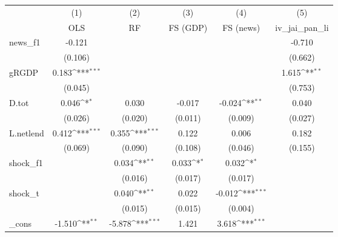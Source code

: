 {
\def\sym#1{\ifmmode^{#1}\else\(^{#1}\)\fi}
\begin{tabular}{l*{5}{c}}
\toprule
            &\multicolumn{1}{c}{(1)}&\multicolumn{1}{c}{(2)}&\multicolumn{1}{c}{(3)}&\multicolumn{1}{c}{(4)}&\multicolumn{1}{c}{(5)}\\
            &\multicolumn{1}{c}{OLS}&\multicolumn{1}{c}{RF}&\multicolumn{1}{c}{FS (GDP)}&\multicolumn{1}{c}{FS (news)}&\multicolumn{1}{c}{iv\_jai\_pan\_li}\\
\midrule
news\_f1     &      -0.121         &                     &                     &                     &      -0.710         \\
            &     (0.106)         &                     &                     &                     &     (0.662)         \\
\addlinespace
gRGDP       &       0.183\sym{***}&                     &                     &                     &       1.615\sym{**} \\
            &     (0.045)         &                     &                     &                     &     (0.753)         \\
\addlinespace
D.tot       &       0.046\sym{*}  &       0.030         &      -0.017         &      -0.024\sym{**} &       0.040         \\
            &     (0.026)         &     (0.020)         &     (0.011)         &     (0.009)         &     (0.027)         \\
\addlinespace
L.netlend   &       0.412\sym{***}&       0.355\sym{***}&       0.122         &       0.006         &       0.182         \\
            &     (0.069)         &     (0.090)         &     (0.108)         &     (0.046)         &     (0.155)         \\
\addlinespace
shock\_f1    &                     &       0.034\sym{**} &       0.033\sym{*}  &       0.032\sym{*}  &                     \\
            &                     &     (0.016)         &     (0.017)         &     (0.017)         &                     \\
\addlinespace
shock\_t     &                     &       0.040\sym{**} &       0.022         &      -0.012\sym{***}&                     \\
            &                     &     (0.015)         &     (0.015)         &     (0.004)         &                     \\
\addlinespace
\_cons      &      -1.510\sym{**} &      -5.878\sym{***}&       1.421         &       3.618\sym{***}&                     \\

\end{tabular}}
